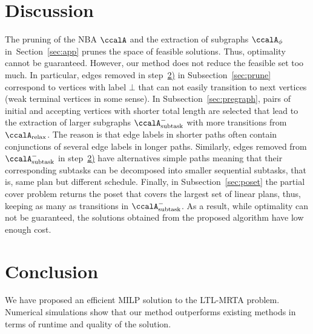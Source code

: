 \documentclass[journal]{IEEEtran}
\newcommand{\auto}[1]{\ccalA_{\text{#1}}}
\newcommand{\autop}{\ccalA_{\phi}}
\begin{document}
\section{Discussion}
The pruning of the NBA $\ccalA$ and the extraction of subgraphs $\autop$ in~Section~\ref{sec:app} prunes the space of feasible solutions. Thus, optimality cannot be guaranteed. However, our method does not reduce the feasible set  too much. In particular, edges removed in step~\hyperref[prune:2]{2)} in Subsection~\ref{sec:prune} correspond to vertices with label $\bot$ that can not easily transition to next vertices {(weak terminal vertices in some sense)}. {In Subsection~\ref{sec:pregraph}, pairs of initial and accepting vertices with shorter total length are selected that lead to the  extraction of larger subgraphs $\auto{subtask}^-$ {with more transitions} from $\auto{relax}$.} {The reason is that edge labels in shorter paths often contain conjunctions of several edge labels in longer paths}. Similarly, edges removed from $\auto{subtask}^-$ in step~\hyperref[sec:pregraph]{2)} {have alternatives simple paths} meaning that their corresponding subtasks can be decomposed into smaller sequential subtasks, {that is, same plan but different schedule}. Finally, in Subsection~\ref{sec:poset} the partial cover problem returns the poset that covers the largest set of linear plans, thus, keeping as many as transitions in $\auto{subtask}^-$. As a result, while optimality can not be guaranteed,  the solutions obtained from the proposed algorithm have low  enough cost. %
\section{Conclusion}
We have proposed an efficient MILP solution to the LTL-MRTA problem. Numerical simulations show that our method outperforms existing methods in terms of runtime and quality of the solution.


\end{document}
